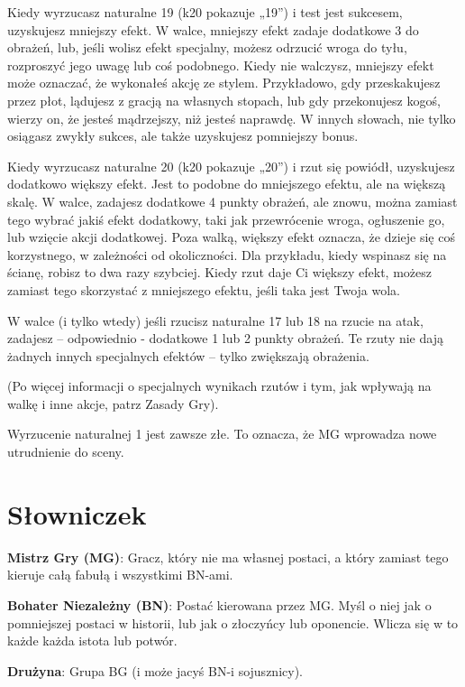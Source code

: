 Kiedy wyrzucasz naturalne 19 (k20 pokazuje „19”) i test jest sukcesem, uzyskujesz mniejszy efekt. W walce, mniejszy efekt zadaje dodatkowe 3 do obrażeń, lub, jeśli wolisz efekt specjalny, możesz odrzucić wroga do tyłu, rozproszyć jego uwagę lub coś podobnego. Kiedy nie walczysz, mniejszy efekt może oznaczać, że wykonałeś akcję ze stylem. Przykładowo, gdy przeskakujesz przez płot, lądujesz z gracją na własnych stopach, lub gdy przekonujesz kogoś, wierzy on, że jesteś mądrzejszy, niż jesteś naprawdę. W innych słowach, nie tylko osiągasz zwykły sukces, ale także uzyskujesz pomniejszy bonus. 

Kiedy wyrzucasz naturalne 20 (k20 pokazuje „20”) i rzut się powiódł, uzyskujesz dodatkowo większy efekt. Jest to podobne do mniejszego efektu, ale na większą skalę. W walce, zadajesz dodatkowe 4 punkty obrażeń, ale znowu, można zamiast tego wybrać jakiś efekt dodatkowy, taki jak przewrócenie wroga, ogłuszenie go, lub wzięcie akcji dodatkowej. Poza walką, większy efekt oznacza, że dzieje się coś korzystnego, w zależności od okoliczności. Dla przykładu, kiedy wspinasz się na ścianę, robisz to dwa razy szybciej. Kiedy rzut daje Ci większy efekt, możesz zamiast tego skorzystać z mniejszego efektu, jeśli taka jest Twoja wola.

W walce (i tylko wtedy) jeśli rzucisz naturalne 17 lub 18 na rzucie na atak, zadajesz – odpowiednio - dodatkowe 1 lub 2 punkty obrażeń. Te rzuty nie dają żadnych innych specjalnych efektów – tylko zwiększają obrażenia.

(Po więcej informacji o specjalnych wynikach rzutów i tym, jak wpływają na walkę i inne akcje, patrz Zasady Gry).

Wyrzucenie naturalnej 1 jest zawsze złe. To oznacza, że MG wprowadza nowe utrudnienie do sceny. 

\section {Słowniczek}

{\bfseries Mistrz Gry (MG)}: Gracz, który nie ma własnej postaci, a który zamiast tego kieruje całą fabułą i wszystkimi BN-ami.

{\bfseries Bohater Niezależny (BN)}: Postać kierowana przez MG. Myśl o niej jak o pomniejszej postaci w historii, lub jak o złoczyńcy lub oponencie. Wlicza się w to każde każda istota lub potwór.

{\bfseries Drużyna}: Grupa BG (i może jacyś BN-i sojusznicy).

